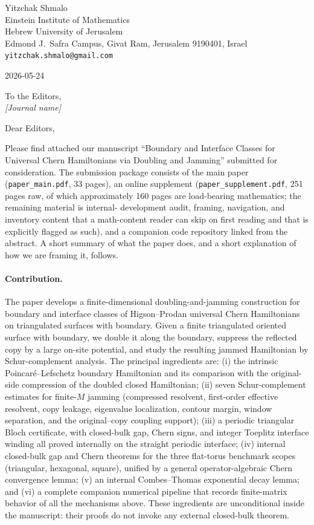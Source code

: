 \documentclass[11pt]{article}
\begin{document}
\noindent
Yitzchak Shmalo \\
Einstein Institute of Mathematics \\
Hebrew University of Jerusalem \\
Edmond J.~Safra Campus, Givat Ram, Jerusalem 9190401, Israel \\
\texttt{yitzchak.shmalo@gmail.com}

\vspace{0.6em}
\hfill 2026-05-24

\vspace{1.2em}
\noindent
To the Editors, \\
\emph{[Journal name]}

\vspace{0.8em}
\noindent
Dear Editors,

Please find attached our manuscript ``Boundary and Interface Classes for
Universal Chern Hamiltonians via Doubling and Jamming'' submitted for
consideration. The submission package consists of the main paper
(\texttt{paper\_main.pdf}, 33 pages), an online supplement
(\texttt{paper\_supplement.pdf}, 251 pages raw, of which approximately 160
pages are load-bearing mathematics; the remaining material is internal-%
development audit, framing, navigation, and inventory content that a
math-content reader can skip on first reading and that is explicitly
flagged as such), and a companion code repository linked from the
abstract. A short summary of what the paper does, and a short explanation
of how we are framing it, follows.

\paragraph{Contribution.}
The paper develops a finite-dimensional doubling-and-jamming construction
for boundary and interface classes of Higson--Prodan universal Chern
Hamiltonians on triangulated surfaces with boundary. Given a finite
triangulated oriented surface with boundary, we double it along the boundary,
suppress the reflected copy by a large on-site potential, and study the
resulting jammed Hamiltonian by Schur-complement analysis. The principal
ingredients are: (i) the intrinsic Poincar\'e--Lefschetz boundary
Hamiltonian and its comparison with the original-side compression of the
doubled closed Hamiltonian; (ii) seven Schur-complement estimates for
finite-$M$ jamming (compressed resolvent, first-order effective resolvent,
copy leakage, eigenvalue localization, contour margin, window separation,
and the original--copy coupling support); (iii) a periodic triangular Bloch
certificate, with closed-bulk gap, Chern signs, and integer Toeplitz
interface winding all proved internally on the straight periodic interface;
(iv) internal closed-bulk gap and Chern theorems for the three flat-torus
benchmark scopes (triangular, hexagonal, square), unified by a general
operator-algebraic Chern convergence lemma; (v) an internal Combes--Thomas
exponential decay lemma; and (vi) a complete companion numerical pipeline
that records finite-matrix behavior of all the mechanisms above. These
ingredients are unconditional inside the manuscript: their proofs do not
invoke any external closed-bulk theorem.
\end{document}
